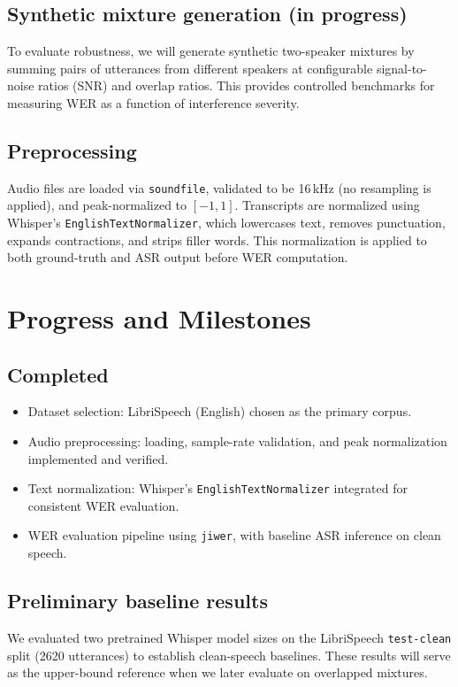 \documentclass{article}
\begin{document}
\subsection{Synthetic mixture generation (in progress)}
To evaluate robustness, we will generate synthetic two-speaker mixtures by summing pairs of utterances from different speakers at configurable signal-to-noise ratios (SNR) and overlap ratios. This provides controlled benchmarks for measuring WER as a function of interference severity.

\subsection{Preprocessing}
Audio files are loaded via \texttt{soundfile}, validated to be 16\,kHz (no resampling is applied), and peak-normalized to $[-1, 1]$. Transcripts are normalized using Whisper's \texttt{EnglishTextNormalizer}, which lowercases text, removes punctuation, expands contractions, and strips filler words. This normalization is applied to both ground-truth and ASR output before WER computation.


\section{Progress and Milestones}

\subsection{Completed}
\begin{itemize}
    \item Dataset selection: LibriSpeech (English) chosen as the primary corpus.
    \item Audio preprocessing: loading, sample-rate validation, and peak normalization implemented and verified.
    \item Text normalization: Whisper's \texttt{EnglishTextNormalizer} integrated for consistent WER evaluation.
    \item WER evaluation pipeline using \texttt{jiwer}, with baseline ASR inference on clean speech.
\end{itemize}

\subsection{Preliminary baseline results}

We evaluated two pretrained Whisper model sizes on the LibriSpeech \texttt{test-clean} split (2620 utterances) to establish clean-speech baselines. These results will serve as the upper-bound reference when we later evaluate on overlapped mixtures.
\end{document}

